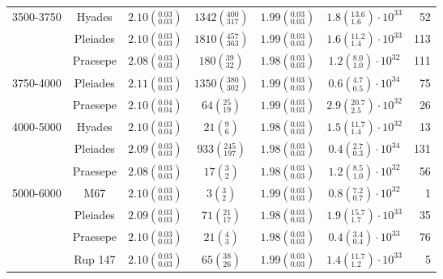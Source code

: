 \begin{tabular}{lcccccr}
3500-3750 & Hyades &  $2.10\left(^{0.03}_{0.03}\right)$ &    $1342\left(^{400}_{317}\right)$ &  $1.99\left(^{0.03}_{0.03}\right)$ &  $1.8\left(^{13.6}_{1.6}\right)\cdot 10^{33}$ &   52 \\
          & Pleiades &  $2.10\left(^{0.03}_{0.03}\right)$ &    $1810\left(^{457}_{363}\right)$ &  $1.99\left(^{0.03}_{0.03}\right)$ &  $1.6\left(^{11.2}_{1.4}\right)\cdot 10^{33}$ &  113 \\
          & Praesepe &  $2.08\left(^{0.03}_{0.03}\right)$ &       $180\left(^{39}_{32}\right)$ &  $1.98\left(^{0.03}_{0.03}\right)$ &   $1.2\left(^{8.0}_{1.0}\right)\cdot 10^{32}$ &  111 \\
3750-4000 & Pleiades &  $2.11\left(^{0.03}_{0.03}\right)$ &    $1350\left(^{380}_{302}\right)$ &  $1.99\left(^{0.03}_{0.03}\right)$ &   $0.6\left(^{4.7}_{0.5}\right)\cdot 10^{34}$ &   75 \\
          & Praesepe &  $2.10\left(^{0.04}_{0.04}\right)$ &        $64\left(^{25}_{19}\right)$ &  $1.99\left(^{0.03}_{0.03}\right)$ &  $2.9\left(^{20.7}_{2.5}\right)\cdot 10^{32}$ &   26 \\
4000-5000 & Hyades &  $2.10\left(^{0.03}_{0.04}\right)$ &          $21\left(^{9}_{6}\right)$ &  $1.98\left(^{0.03}_{0.03}\right)$ &  $1.5\left(^{11.7}_{1.4}\right)\cdot 10^{32}$ &   13 \\
          & Pleiades &  $2.09\left(^{0.03}_{0.03}\right)$ &     $933\left(^{245}_{197}\right)$ &  $1.98\left(^{0.03}_{0.03}\right)$ &   $0.4\left(^{2.7}_{0.3}\right)\cdot 10^{34}$ &  131 \\
          & Praesepe &  $2.08\left(^{0.03}_{0.03}\right)$ &          $17\left(^{3}_{2}\right)$ &  $1.98\left(^{0.03}_{0.03}\right)$ &   $1.2\left(^{8.5}_{1.0}\right)\cdot 10^{32}$ &   56 \\
5000-6000 & M67 &  $2.10\left(^{0.03}_{0.03}\right)$ &           $3\left(^{3}_{2}\right)$ &  $1.99\left(^{0.03}_{0.03}\right)$ &   $0.8\left(^{7.2}_{0.7}\right)\cdot 10^{32}$ &    1 \\
          & Pleiades &  $2.09\left(^{0.03}_{0.03}\right)$ &        $71\left(^{21}_{17}\right)$ &  $1.98\left(^{0.03}_{0.03}\right)$ &  $1.9\left(^{15.7}_{1.7}\right)\cdot 10^{33}$ &   35 \\
          & Praesepe &  $2.10\left(^{0.03}_{0.03}\right)$ &          $21\left(^{4}_{3}\right)$ &  $1.98\left(^{0.03}_{0.03}\right)$ &   $0.4\left(^{3.4}_{0.4}\right)\cdot 10^{33}$ &   76 \\
          & Rup 147 &  $2.10\left(^{0.03}_{0.03}\right)$ &        $65\left(^{38}_{26}\right)$ &  $1.99\left(^{0.03}_{0.03}\right)$ &  $1.4\left(^{11.7}_{1.2}\right)\cdot 10^{33}$ &    5 \\
\hline

\end{tabular}

